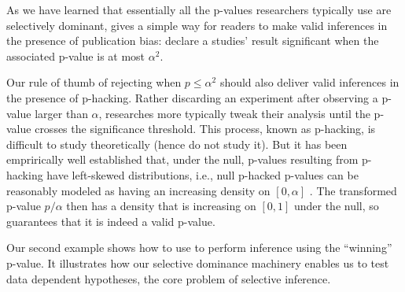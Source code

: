 \documentclass{article}
\begin{document}
As we have learned that essentially all the p-values researchers typically use are selectively dominant,  gives a simple way for readers to make valid inferences in the presence of publication bias: declare a studies' result significant when the associated p-value is at most $\alpha^2$.

Our rule of thumb of rejecting when $p \leq \alpha^2$ should also deliver valid inferences in the presence of p-hacking. Rather discarding an experiment after observing a p-value larger than $\alpha$, researches more typically tweak their analysis until the p-value crosses the significance threshold. This process, known as p-hacking, is difficult to study theoretically (hence \cite{Hung2020} do not study it). But it has been emprirically well established that, under the null, p-values resulting from p-hacking have left-skewed distributions, i.e., null p-hacked p-values can be reasonably modeled as having an increasing density on $[0,\alpha]$ \citep{Simonsohn}. The transformed p-value $p/\alpha$ then has a density that is increasing on $[0, 1]$ under the null, so  guarantees that it is indeed a valid p-value.

Our second example shows how to use  to perform inference using the ``winning'' p-value. It illustrates how our selective dominance machinery enables us to test data dependent hypotheses, the core problem of selective inference. 
\end{document}
